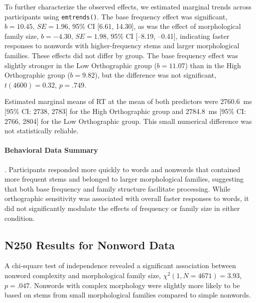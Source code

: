 \documentclass[preprint,12pt, authoryear, review]{elsarticle}
\begin{document}
To further characterize the observed effects, we estimated marginal trends across participants using \texttt{emtrends()}. The base frequency effect was significant, $b = 10.45$, $SE = 1.96$, 95\% CI [6.61, 14.30], as was the effect of morphological family size, $b = -4.30$, $SE = 1.98$, 95\% CI [--8.19, --0.41], indicating faster responses to nonwords with higher-frequency stems and larger morphological families. These effects did not differ by group. The base frequency effect was slightly stronger in the Low Orthographic group ($b = 11.07$) than in the High Orthographic group ($b = 9.82$), but the difference was not significant, $t(4600) = 0.32$, $p = .749$.

Estimated marginal means of RT at the mean of both predictors were 2760.6~ms [95\% CI: 2738, 2783] for the High Orthographic group and 2784.8~ms [95\% CI: 2766, 2804] for the Low Orthographic group. This small numerical difference was not statistically reliable.

\paragraph{Behavioral Data Summary}. Participants responded more quickly to words and nonwords that contained more frequent stems and belonged to larger morphological families, suggesting that both base frequency and family structure facilitate processing. While orthographic sensitivity was associated with overall faster responses to words, it did not significantly modulate the effects of frequency or family size in either condition.



\subsection{N250 Results for Nonword Data}

A chi-square test of independence revealed a significant association between nonword complexity and morphological family size, $\chi^2(1, N = 4671) = 3.93$, $p = .047$. Nonwords with complex morphology were slightly more likely to be based on stems from small morphological families compared to simple nonwords.
\end{document}
